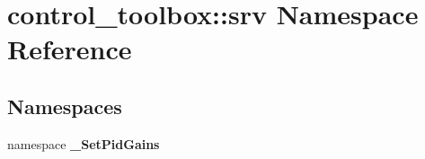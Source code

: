 \section{control\-\_\-toolbox\-:\-:srv \-Namespace \-Reference}
\label{namespacecontrol__toolbox_1_1srv}
\subsection*{\-Namespaces}
\begin{DoxyCompactItemize}
\item 
namespace {\bf \-\_\-\-Set\-Pid\-Gains}
\end{DoxyCompactItemize}
